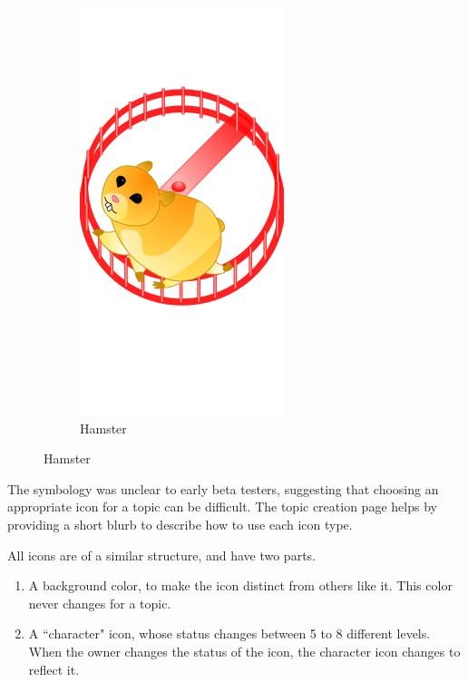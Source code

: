 \begin{figure}
\begin{subfigure}[b]{0.3\textwidth}
        \includegraphics[width=.7\textwidth]{ic_hamster2.png}
        \caption{Hamster}
      \end{subfigure}
      \label{fig:icon_types}
    \end{figure}

      The symbology was unclear to early beta testers,
      suggesting that choosing an appropriate icon for a topic can be difficult.
      The topic creation page helps by providing
      a short blurb to describe how to use each icon type.

      All icons are of a similar structure, and have two parts.
      \begin{enumerate}
      \item A background color, to make the icon distinct from others like it.
      This color never changes for a topic.
      \item A ``character" icon, whose status changes between 5 to 8 different levels.
      When the owner changes the status of the icon,
      the character icon changes to reflect it.
      \end{enumerate}

